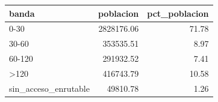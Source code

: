 \begin{tabular}{lrr}
\toprule
banda & poblacion & pct_poblacion \\
\midrule
0-30 & 2828176.06 & 71.78 \\
30-60 & 353535.51 & 8.97 \\
60-120 & 291932.52 & 7.41 \\
>120 & 416743.79 & 10.58 \\
sin_acceso_enrutable & 49810.78 & 1.26 \\
\bottomrule
\end{tabular}
